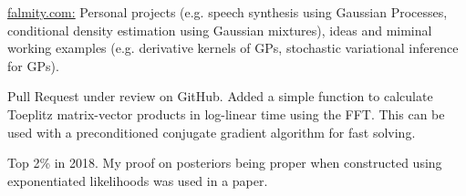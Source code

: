 

\begin{cvskills}

  {\href{https://www.falmity.com}{falmity.com:} Personal projects (e.g. speech synthesis using Gaussian Processes, conditional density estimation using Gaussian mixtures), ideas and miminal working examples (e.g. derivative kernels of GPs, stochastic variational inference for GPs).}

  {Pull Request under review on GitHub. Added a simple function to calculate Toeplitz matrix-vector products in log-linear time using the FFT. This can be used with a preconditioned conjugate gradient algorithm for fast solving.}

  {Top 2\% in 2018. My proof on posteriors being proper when constructed using exponentiated likelihoods was used in a paper.}


\end{cvskills}




